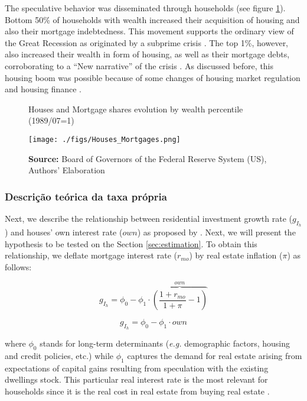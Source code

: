 \documentclass[12pt, a4paper]{article}
\begin{document}
The speculative behavior was disseminated through households (see figure \ref{fig:mort_houses}).
Bottom 50\% of households with wealth increased their acquisition of housing and also their mortgage indebtedness.
This movement supports the ordinary view of the Great Recession as originated by a subprime crisis \cite{mian_consequences_2009}.
The top 1\%, however, also increased their wealth in form of housing, as well as their mortgage debts, corroborating to a ``New narrative'' of the crisis \cite{albanesi_2017_Credit}.
As discussed before, this housing boom was possible because of some changes of housing market regulation and housing finance \cite{federal_deposit_insurance_corporation_savings_1997,mccarthyMonetaryPolicyTransmission2002,wall_too_2010}.

\begin{figure}[H]
	\centering
	\caption{Houses and Mortgage shares evolution by wealth percentile (1989/07=1)}
	\label{fig:mort_houses}
	\texttt{[image: ./figs/Houses\_Mortgages.png]}
	\caption*{\textbf{Source:} Board of Governors of the Federal Reserve System (US), Authors' Elaboration}
\end{figure}


\subsubsection{Descrição teórica da taxa própria}
\label{sec:org680e695}
Next, we describe the relationship between residential investment growth rate (\(g_{I_h}\)) and houses' own interest rate (\(own\)) as proposed by \textcite{teixeira_crescimento_2015}.
Next, we will present the hypothesis to be tested on the Section \ref{sec:estimation}. To obtain this relationship, we deflate mortgage interest rate (\(r_{mo}\)) by real estate inflation (\(\pi\)) as follows:

$$
g_{I_h} = \phi_0 - \phi_1\cdot \overbrace{\left(\frac{1+r_{mo}}{1+\pi} - 1\right)}^{own}
$$

\begin{equation}
g_{I_h} = \phi_0 - \phi_1\cdot own
\end{equation}

where \(\phi_0\) stands for long-term determinants (\emph{e.g.} demographic factors, housing and credit policies, etc.) while \(\phi_1\) captures the demand for real estate arising from expectations of capital gains resulting from speculation with the existing dwellings stock.
This particular real interest rate is the most relevant for households since it is the real cost in real estate from buying real estate  \cite[p.~53]{teixeira_crescimento_2015}.
\end{document}
